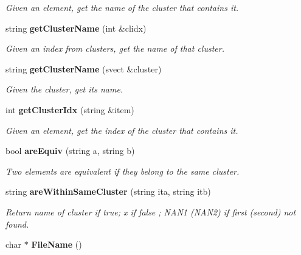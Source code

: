 \begin{CompactItemize}
\begin{CompactList}\small\item\em Given an element, get the name of the cluster that contains it. \item\end{CompactList}\item 
string {\bf get\-Cluster\-Name} (int \&clidx)\label{classPartition_a42}

\begin{CompactList}\small\item\em Given an index from clusters, get the name of that cluster. \item\end{CompactList}\item 
string {\bf get\-Cluster\-Name} (svect \&cluster)\label{classPartition_a43}

\begin{CompactList}\small\item\em Given the cluster, get its name. \item\end{CompactList}\item 
int {\bf get\-Cluster\-Idx} (string \&item)\label{classPartition_a44}

\begin{CompactList}\small\item\em Given an element, get the index of the cluster that contains it. \item\end{CompactList}\item 
bool {\bf are\-Equiv} (string a, string b)\label{classPartition_a45}

\begin{CompactList}\small\item\em Two elements are equivalent if they belong to the same cluster. \item\end{CompactList}\item 
string {\bf are\-Within\-Same\-Cluster} (string ita, string itb)\label{classPartition_a46}

\begin{CompactList}\small\item\em Return name of cluster if true; x if false ; NAN1 (NAN2) if first (second) not found. \item\end{CompactList}\item 
char $\ast$ {\bf File\-Name} ()\label{classPartition_a47}


\end{CompactItemize}
